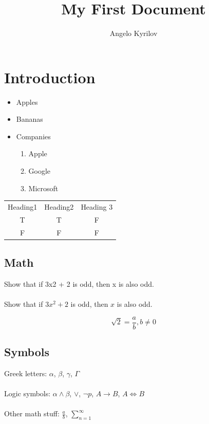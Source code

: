 \documentclass[11pt]{article}
\title{My First Document}
\author{Angelo Kyrilov}
\begin{document}
	
\maketitle

\section{Introduction}


\begin{itemize}
	\item Apples
	\item Bananas
	\item Companies
	\begin{enumerate}
		\item Apple
		\item Google
		\item Microsoft
	\end{enumerate}
\end{itemize}


\begin{tabular}{c c c}
	Heading1 & Heading2 & Heading 3 \\
	T & T & F \\
	F & F & F \\
\end{tabular}

\subsection{Math}

Show that if 3x2 + 2 is odd, then x is also odd.\\\\

Show that if $3x^2 + 2$ is odd, then $x$ is also odd.

\begin{displaymath}
	\sqrt{2} = \frac{a}{b}, b \neq 0
\end{displaymath}

\subsection{Symbols}

Greek letters: $\alpha$, $\beta$, $\gamma$, $\Gamma$\\\\
Logic symbols: $\alpha \land \beta$, $\lor$, $\lnot p$, $A \to B$, $A \iff B$ \\\\
Other math stuff: $\frac{a}{b}$, $\sum_{n=1}^{\infty}$
\end{document}
